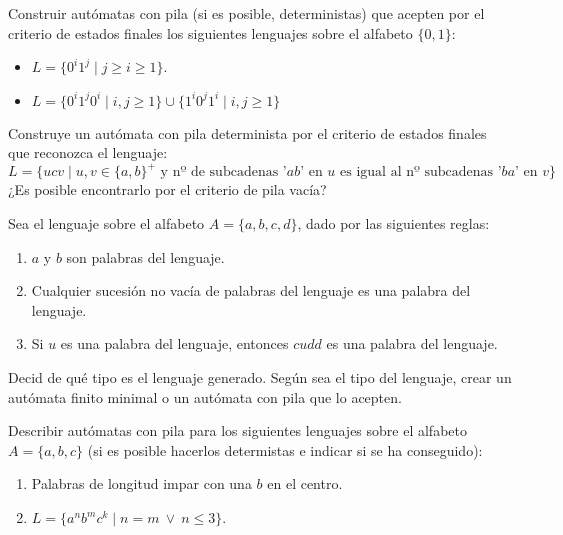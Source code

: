 \begin{ejercicio}\label{ej:1.5.20}
    Construir autómatas con pila (si es posible, deterministas) que acepten por el criterio de estados finales los siguientes lenguajes sobre el alfabeto $\{0,1\}$:
    \begin{itemize}
        \item $L = \{0^i 1^j \mid j\geq i \geq 1\}$.
        \item $L = \{0^i 1^j 0^i \mid i,j\geq 1\}\cup \{1^i 0^j 1^i \mid i,j\geq 1\}$
    \end{itemize}
\end{ejercicio}

\begin{ejercicio}\label{ej:1.5.21}
    Construye un autómata con pila determinista por el criterio de estados finales que reconozca el lenguaje:
    \begin{equation*}
        L = \{ucv\mid u,v\in {\{a,b\}}^{+} \text{\ y nº de subcadenas '}ab \text{' en\ } u \text{\ es igual al nº subcadenas '} ba \text{' en\ }v\}
    \end{equation*}
    ¿Es posible encontrarlo por el criterio de pila vacía?
\end{ejercicio}

\begin{ejercicio}\label{ej:1.5.22}
    Sea el lenguaje sobre el alfabeto $A = \{a,b,c,d\}$, dado por las siguientes reglas:
    \begin{enumerate}[label=\alph*)]
        \item $a$ y $b$ son palabras del lenguaje.
        \item Cualquier sucesión no vacía de palabras del lenguaje es una palabra del lenguaje.
        \item Si $u$ es una palabra del lenguaje, entonces $cudd$ es una palabra del lenguaje.
    \end{enumerate}
    Decid de qué tipo es el lenguaje generado. Según sea el tipo del lenguaje, crear un autómata finito minimal o un autómata con pila que lo acepten.
\end{ejercicio}

\begin{ejercicio}\label{ej:1.5.23}
    Describir autómatas con pila para los siguientes lenguajes sobre el alfabeto $A = \{a,b,c\}$ (si es posible hacerlos determistas e indicar si se ha conseguido):
    \begin{enumerate}[label=\alph*)]
        \item Palabras de longitud impar con una $b$ en el centro.
        \item $L = \{a^n b^m c^k \mid n = m\ \lor\ n \leq 3\}$.
    \end{enumerate}
\end{ejercicio}

